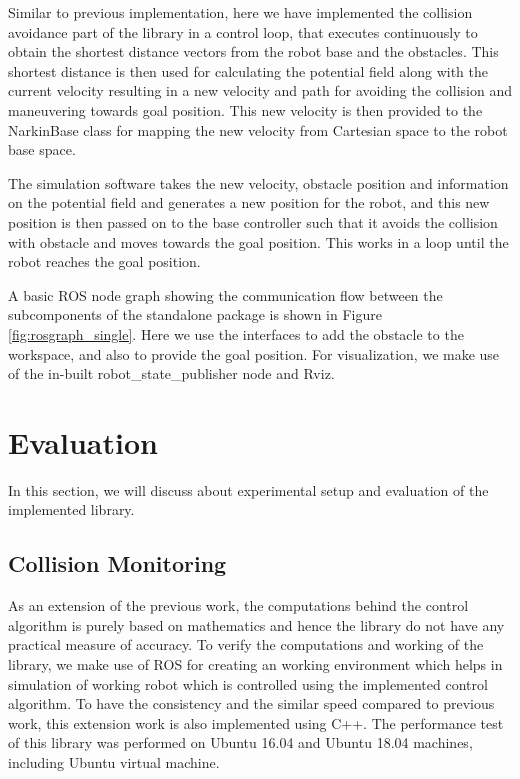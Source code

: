 \documentclass[a4paper, 11.5pt, conference]{ieeeconf}      %
\begin{document}
Similar to previous implementation, here we have implemented the collision avoidance part of the library in a control loop, that executes continuously to obtain the shortest distance vectors from the robot base and the obstacles. This shortest distance is then used for calculating the potential field along with the current velocity resulting in a new velocity and path for avoiding the collision and maneuvering towards goal position. This new velocity is then provided to the NarkinBase class for mapping the new velocity from Cartesian space to the robot base space.

The simulation software takes the new velocity, obstacle position and information on the potential field and generates a new position for the robot, and this new position is then passed on to the base controller such that it avoids the collision with obstacle and moves towards the goal position. This works in a loop until the robot reaches the goal position. 

A basic ROS node graph showing the communication flow between the subcomponents of the standalone package is shown in Figure \ref{fig:rosgraph_single}. Here we use the interfaces to add the obstacle to the workspace, and also to provide the goal position. For visualization, we make use of the in-built robot\_state\_publisher node and Rviz.

\section{Evaluation}
In this section, we will discuss about experimental setup and evaluation of the implemented library.

\subsection{Collision Monitoring}
As an extension of the previous work, the computations behind the control algorithm is purely based on mathematics and hence the library do not have any practical measure of accuracy. To verify the computations and working of the library, we make use of ROS for creating an working environment which helps in simulation of working robot which is controlled using the implemented control algorithm. To have the consistency and the similar speed compared to previous work, this extension work is also implemented using C++. The performance test of this library was performed on Ubuntu 16.04 and Ubuntu 18.04 machines, including Ubuntu virtual machine.
\end{document}
